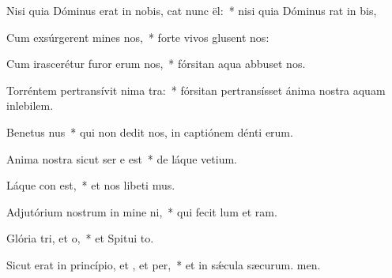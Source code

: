 \item Nisi quia Dóminus erat in nobis, cat nunc ël:~* nisi quia Dóminus rat in bis,
\item Cum exsúrgerent mines  nos,~* forte vivos glusent nos:
\item Cum irascerétur furor erum  nos,~* fórsitan aqua abbuset nos.
\item Torréntem pertransívit nima tra:~* fórsitan pertransísset ánima nostra aquam inlebilem.
\item Benetus nus~* qui non dedit nos, in captiónem dénti erum.
\item Anima nostra sicut ser e est~* de láque vetium.
\item Láque con est,~* et nos libeti mus.
\item Adjutórium nostrum in mine ni,~* qui fecit lum et ram.
\item Glória tri, et o,~* et Spitui to.
\item Sicut erat in princípio, et , et per,~* et in sǽcula sæcurum. men.
